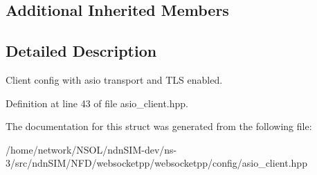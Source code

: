 \subsection*{Additional Inherited Members}


\subsection{Detailed Description}
Client config with asio transport and T\+LS enabled. 

Definition at line 43 of file asio\+\_\+client.\+hpp.



The documentation for this struct was generated from the following file\+:\begin{DoxyCompactItemize}
\item 
/home/network/\+N\+S\+O\+L/ndn\+S\+I\+M-\/dev/ns-\/3/src/ndn\+S\+I\+M/\+N\+F\+D/websocketpp/websocketpp/config/asio\+\_\+client.\+hpp\end{DoxyCompactItemize}
